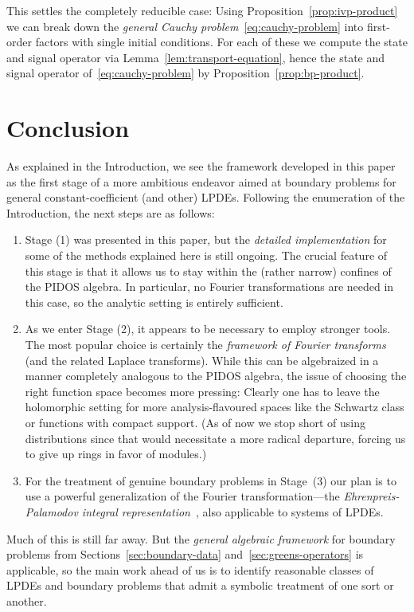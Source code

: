 \documentclass[a4paper]{llncs}
\begin{document}
This settles the completely reducible case: Using
Proposition~\ref{prop:ivp-product} we can break down the \emph{general Cauchy
  problem}~\eqref{eq:cauchy-problem} into first-order factors with single
initial conditions. For each of these we compute the state and signal operator
via Lemma~\ref{lem:transport-equation}, hence the state and signal operator
of~\eqref{eq:cauchy-problem} by Proposition~\ref{prop:bp-product}.


\section{Conclusion}
\label{sec:conclusion}


As explained in the Introduction, we see the framework developed in this paper
as the first stage of a more ambitious endeavor aimed at boundary problems for
general constant-coefficient (and other) LPDEs. Following the enumeration of the
Introduction, the next steps are as follows:
\begin{enumerate}
\item Stage (1) was presented in this paper, but the \emph{detailed
    implementation} for some of the methods explained here is still ongoing. The
  crucial feature of this stage is that it allows us to stay within the (rather
  narrow) confines of the PIDOS algebra. In particular, no Fourier
  transformations are needed in this case, so the analytic setting is entirely
  sufficient.
\item As we enter Stage (2), it appears to be necessary to employ stronger
  tools. The most popular choice is certainly the \emph{framework of Fourier
    transforms} (and the related Laplace transforms). While this can be
  algebraized in a manner completely analogous to the PIDOS algebra, the issue
  of choosing the right function space becomes more pressing: Clearly one has to
  leave the holomorphic setting for more analysis-flavoured spaces like the
  Schwartz class or functions with compact support. (As of now we stop short of
  using distributions since that would necessitate a more radical departure,
  forcing us to give up rings in favor of modules.)
\item For the treatment of genuine boundary problems in Stage~(3) our plan is to
  use a powerful generalization of the Fourier transformation---the
  \emph{Ehrenpreis-Palamodov integral representation}~\cite{Hansen1983}, also
  applicable to systems of LPDEs.
\end{enumerate}

Much of this is still far away. But the \emph{general algebraic framework} for
boundary problems from Sections~\ref{sec:boundary-data}
and~\ref{sec:greens-operators} is applicable, so the main work ahead of us is to
identify reasonable classes of LPDEs and boundary problems that admit a symbolic
treatment of one sort or another.
\end{document}
